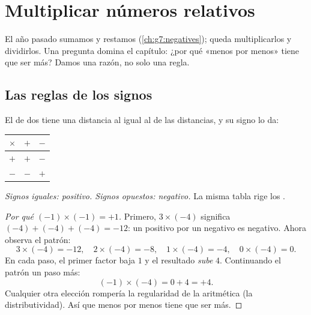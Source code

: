 \chapter{Multiplicar números relativos}\label{ch:g8:negprod}

El año pasado sumamos y restamos 
(\cref{ch:g7:negatives}); queda multiplicarlos y dividirlos. Una
pregunta domina el capítulo: ¿por qué «menos por menos» tiene que ser
más? Damos una razón, no solo una regla.

\section{Las reglas de los signos}

\begin{theorem}\label{thm:g8:negprod:rules}
El  de dos  tiene una distancia al  igual al
 de las distancias, y su signo lo da:
\begin{center}
\renewcommand{\arraystretch}{1.3}
\begin{tabular}{c|cc}
$\times$ & $+$ & $-$ \\
\hline
$+$ & $+$ & $-$ \\
$-$ & $-$ & $+$ \\
\end{tabular}
\end{center}
\emph{Signos iguales:  positivo. Signos opuestos:  negativo.}
La misma tabla rige los .
\end{theorem}

\begin{proof}[Por qué $(-1) \times (-1) = +1$]
Primero, $3 \times (-4)$ significa $(-4) + (-4) + (-4) = -12$: un positivo
por un negativo es negativo. Ahora observa el patrón:
\[
3 \times (-4) = -12, \quad
2 \times (-4) = -8, \quad
1 \times (-4) = -4, \quad
0 \times (-4) = 0 .
\]
En cada paso, el primer factor baja $1$ y el resultado \emph{sube}
$4$. Continuando el patrón un paso más:
\[
(-1) \times (-4) = 0 + 4 = +4 .
\]
Cualquier otra elección rompería la regularidad de la aritmética
(la distributividad). Así que menos por menos tiene que ser más.
\end{proof}

